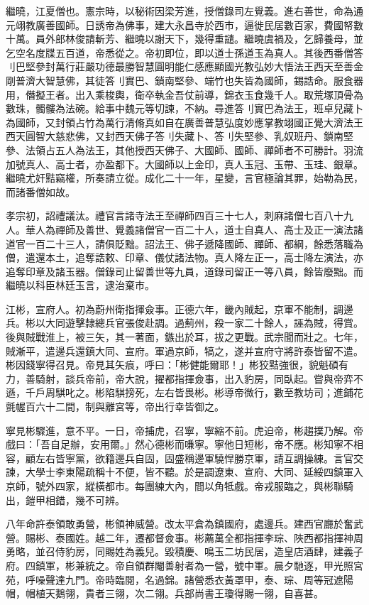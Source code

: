 \begin{pinyinscope}
繼曉，江夏僧也。憲宗時，以秘術因梁芳進，授僧錄司左覺義。進右善世，命為通元翊教廣善國師。日誘帝為佛事，建大永昌寺於西市，逼徙民居數百家，費國帑數十萬。員外郎林俊請斬芳、繼曉以謝天下，幾得重譴。繼曉虞禍及，乞歸養母，並乞空名度牒五百道，帝悉從之。帝初即位，即以道士孫道玉為真人。其後西番僧答刂巴堅參封萬行莊嚴功德最勝智慧圓明能仁感應顯國光教弘妙大悟法王西天至善金剛普濟大智慧佛，其徒答刂實巴、鎖南堅參、端竹也失皆為國師，錫誥命。服食器用，僭擬王者。出入乘梭輿，衛卒執金吾仗前導，錦衣玉食幾千人。取荒塚頂骨為數珠，髑髏為法碗。給事中魏元等切諫，不納。尋進答刂實巴為法王，班卓兒藏卜為國師，又封領占竹為萬行清脩真如自在廣善普慧弘度妙應掌教翊國正覺大濟法王西天圓智大慈悲佛，又封西天佛子答刂失藏卜、答刂失堅參、乳奴班丹、鎖南堅參、法領占五人為法王，其他授西天佛子、大國師、國師、禪師者不可勝計。羽流加號真人、高士者，亦盈都下。大國師以上金印，真人玉冠、玉帶、玉珪、銀章。繼曉尤奸黠竊權，所奏請立從。成化二十一年，星變，言官極論其罪，始勒為民，而諸番僧如故。

孝宗初，詔禮議汰。禮官言諸寺法王至禪師四百三十七人，刺麻諸僧七百八十九人。華人為禪師及善世、覺義諸僧官一百二十人，道士自真人、高士及正一演法諸道官一百二十三人，請俱貶黜。詔法王、佛子遞降國師、禪師、都綱，餘悉落職為僧，遣還本土，追奪誥敕、印章、儀仗諸法物。真人降左正一，高士降左演法，亦追奪印章及諸玉器。僧錄司止留善世等九員，道錄司留正一等八員，餘皆廢黜。而繼曉以科臣林廷玉言，逮治棄市。

江彬，宣府人。初為蔚州衛指揮僉事。正德六年，畿內賊起，京軍不能制，調邊兵。彬以大同遊擊隸總兵官張俊赴調。過薊州，殺一家二十餘人，誣為賊，得賞。後與賊戰淮上，被三矢，其一著面，鏃出於耳，拔之更戰。武宗聞而壯之。七年，賊漸平，遣邊兵還鎮大同、宣府。軍過京師，犒之，遂并宣府守將許泰皆留不遣。彬因錢寧得召見。帝見其矢痕，呼曰：「彬健能爾耶！」彬狡黠強很，貌魁碩有力，善騎射，談兵帝前，帝大說，擢都指揮僉事，出入豹房，同臥起。嘗與帝弈不遜，千戶周騏叱之。彬陷騏搒死，左右皆畏彬。彬導帝微行，數至教坊司；進鋪花氈幄百六十二間，制與離宮等，帝出行幸皆御之。

寧見彬驟進，意不平。一日，帝捕虎，召寧，寧縮不前。虎迫帝，彬趨撲乃解。帝戲曰：「吾自足辦，安用爾。」然心德彬而嗛寧。寧他日短彬，帝不應。彬知寧不相容，顧左右皆寧黨，欲籍邊兵自固，固盛稱邊軍驍悍勝京軍，請互調操練。言官交諫，大學士李東陽疏稱十不便，皆不聽。於是調遼東、宣府、大同、延綏四鎮軍入京師，號外四家，縱橫都市。每團練大內，間以角牴戲。帝戎服臨之，與彬聯騎出，鎧甲相錯，幾不可辨。

八年命許泰領敢勇營，彬領神威營。改太平倉為鎮國府，處邊兵。建西官廳於奮武營。賜彬、泰國姓。越二年，遷都督僉事。彬薦萬全都指揮李琮、陜西都指揮神周勇略，並召侍豹房，同賜姓為義兒。毀積慶、鳴玉二坊民居，造皇店酒肆，建義子府。四鎮軍，彬兼統之。帝自領群閹善射者為一營，號中軍。晨夕馳逐，甲光照宮苑，呼噪聲達九門。帝時臨閱，名過錦。諸營悉衣黃罩甲，泰、琮、周等冠遮陽帽，帽植天鵝翎，貴者三翎，次二翎。兵部尚書王瓊得賜一翎，自喜甚。


\end{pinyinscope}
